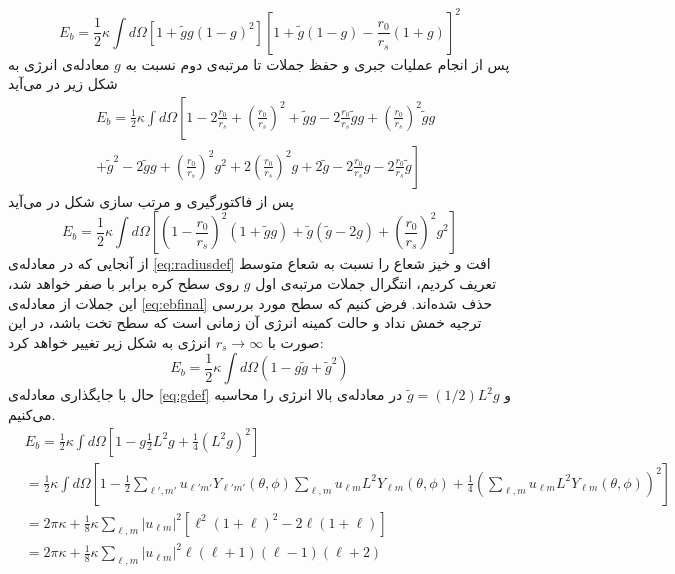 \begin{equation}
E_b=\frac{1}{2}\kappa\int d\Omega\left[1+\tilde gg(1-g)^2\right]\left[1+\tilde g(1-g)-\frac{r_0}{r_s}(1+g)\right]^2
\end{equation}
پس از انجام عملیات جبری و حفظ جملات تا مرتبه‌ی دوم نسبت به $g$
معادله‌ی انرژی به شکل زیر در می‌آید
\begin{equation}
\begin{aligned}
&E_b=\frac{1}{2}\kappa\int d\Omega\left[1-2\frac{r_0}{r_s}+\left(\frac{r_0}{r_s}\right)^2+\tilde gg -2\frac{r_0}{r_s}\tilde gg+\left(\frac{r_0}{r_s}\right)^2\tilde gg\right.\\
&\left.+\tilde g^2-2\tilde gg +\left(\frac{r_0}{r_s}\right)^2g^2+2\left(\frac{r_0}{r_s}\right)^2g+2\tilde g-2\frac{r_0}{r_s}g-2\frac{r_0}{r_s}\tilde g\right]
\end{aligned}
\end{equation}
پس از فاکتورگیری و مرتب سازی شکل در می‌آید
\begin{equation}
E_b=\frac{1}{2}\kappa\int d\Omega\left[\left(1-\frac{r_0}{r_s}\right)^2(1+\tilde gg)+\tilde g(\tilde g-2g)+\left(\frac{r_0}{r_s}\right)^2g^2\right]
\label{eq:ebfinal}
\end{equation}
از آنجایی که در معادله‌ی
\ref{eq:radiusdef}
افت و خیز شعاع را نسبت به شعاع متوسط تعریف کردیم، انتگرال جملات مرتبه‌ی اول $g$ روی سطح کره برابر با صفر خواهد شد، این جملات از معادله‌ی 
\ref{eq:ebfinal}
حذف شده‌اند. فرض کنیم که سطح مورد بررسی ترجیه خمش نداد و حالت کمینه انرژی آن زمانی است که سطح تخت باشد، در این صورت با $r_s\rightarrow\infty$ انرژی به شکل زیر تغییر خواهد کرد:
\begin{equation}
E_b=\frac{1}{2}\kappa\int d\Omega\left(1-g\tilde g+\tilde g^2\right)
\label{eq:ebfinalnors}
\end{equation}
حال با جایگذاری معادله‌ی
\ref{eq:gdef}
و $\tilde g=(1/2)L^2g$ در معادله‌ی بالا انرژی را محاسبه می‌کنیم.
\begin{equation}
\begin{aligned}
&E_b=\frac{1}{2}\kappa\int d\Omega\left[1-g\frac{1}{2}L^2g+\frac{1}{4}\left(L^2g\right)^2\right]\\
&=\frac{1}{2}\kappa\int d\Omega\left[1-\frac{1}{2}\sum_{\ell',m'}u_{\ell' m'}Y_{\ell' m'} (\theta,\phi)\sum_{\ell,m}u_{\ell m}L^2Y_{\ell m} (\theta,\phi)+\frac{1}{4}\left(\sum_{\ell,m}u_{\ell m}L^2Y_{\ell m} (\theta,\phi)\right)^2\right]\\
&=2\pi \kappa+\frac{1}{8}\kappa\sum_{\ell,m}|u_{\ell m}|^2\left[\ell^2(1+\ell)^2-2\ell(1+\ell)\right]\\
&=2\pi\kappa+\frac{1}{8}\kappa\sum_{\ell,m}|u_{\ell m}|^2\ell(\ell+1)(\ell-1)(\ell+2)
\end{aligned}
\end{equation}
